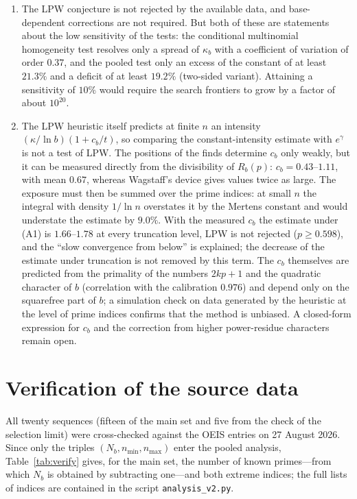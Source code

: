 \documentclass[11pt,a4paper]{article}
\theoremstyle{plain}
\theoremstyle{remark}
\newcommand{\Rb}{R_b}
\newcommand{\eg}{e^{\gamma}}
\begin{document}
\begin{enumerate}
\item The LPW conjecture is not rejected by the available data, and
base-dependent corrections are not required. But both of these are statements
about the low sensitivity of the tests: the conditional multinomial homogeneity
test resolves only a spread of $\kappa_b$ with a coefficient of variation of
order $0.37$, and the pooled test only an excess of the constant of at least
$21.3\%$ and a deficit of at least $19.2\%$ (two-sided variant). Attaining a sensitivity of $10\%$ would require
the search frontiers to grow by a factor of about $10^{20}$.

\item The LPW heuristic itself predicts at finite $n$ an intensity
$(\kappa/\ln b)(1+c_b/t)$, so comparing the constant-intensity estimate with
$\eg$ is not a test of LPW. The positions of the finds determine $c_b$ only
weakly, but it can be measured directly from the divisibility of $\Rb(p)$:
$c_b=0.43$--$1.11$, with mean $0.67$, whereas Wagstaff's device gives values
twice as large. The exposure must then be summed over the prime indices: at small
$n$ the integral with density $1/\ln n$ overstates it by the Mertens constant and
would understate the estimate by $9.0\%$. With the measured $c_b$ the estimate
under (A1) is $1.66$--$1.78$ at every truncation level, LPW is not rejected
($p\ge0.598$), and the ``slow convergence from below'' is explained; the
decrease of the estimate under truncation is not removed by this term. The $c_b$
themselves are predicted from the primality of the numbers $2kp+1$ and the
quadratic character of $b$ (correlation with the calibration $0.976$) and depend
only on the squarefree part of $b$; a simulation check on data generated by the
heuristic at the level of prime indices confirms that the method is unbiased. A
closed-form expression for $c_b$ and the correction from higher power-residue
characters remain open.
\end{enumerate}

\appendix
\section{Verification of the source data}\label{app:data}

All twenty sequences (fifteen of the main set and five from the check of the
selection limit) were cross-checked against the OEIS entries on 27 August 2026.
Since only the triples $(N_b,n_{\min},n_{\max})$ enter the pooled analysis,
Table~\ref{tab:verify} gives, for the main set, the number of known primes---from
which $N_b$ is obtained by subtracting one---and both extreme indices; the full
lists of indices are contained in the script \texttt{analysis\_v2.py}.
\end{document}
